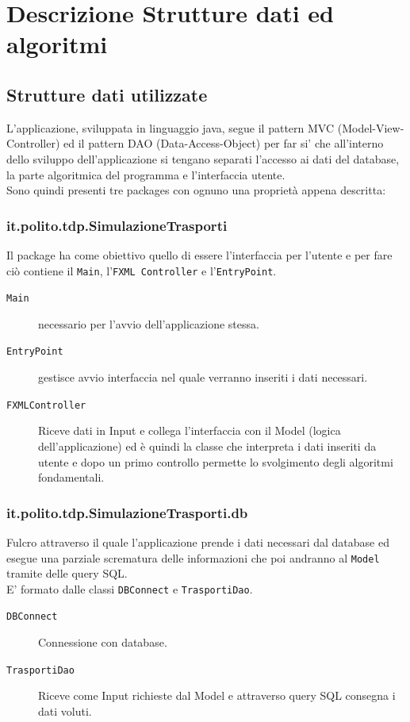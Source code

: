 \documentclass[a4paper,12pt]{report}
\begin{document}
\chapter{Descrizione Strutture dati ed algoritmi}
\label{Cap:DescrizioneStrutture}
\section{Strutture dati utilizzate}
L'applicazione, sviluppata in linguaggio java, segue il pattern MVC (Model-View-Controller) ed il pattern
DAO (Data-Access-Object) per far si' che all'interno dello sviluppo dell'applicazione si tengano
separati l'accesso ai dati del database, la parte algoritmica del programma e l'interfaccia utente.\\
Sono quindi presenti tre packages con ognuno una proprietà appena descritta:

\subsection{it.polito.tdp.SimulazioneTrasporti}
Il package ha come obiettivo quello di essere l'interfaccia per l'utente e per fare ciò contiene
il \texttt{Main}, l'\texttt{FXML Controller} e l'\texttt{EntryPoint}.
\begin{description}
	\item[\texttt{Main}] necessario per l'avvio dell'applicazione stessa.
	\item[\texttt{EntryPoint}] gestisce avvio interfaccia nel quale verranno inseriti i dati necessari.
	\item[\texttt{FXMLController}] Riceve dati in Input e collega l'interfaccia con il Model (logica dell'applicazione)
	ed è quindi la classe che interpreta i dati inseriti da utente e dopo un primo controllo permette 
	lo svolgimento degli algoritmi fondamentali.
\end{description}

\subsection{it.polito.tdp.SimulazioneTrasporti.db}
Fulcro attraverso il quale l'applicazione prende i dati necessari dal database ed esegue una parziale 
scrematura delle informazioni che poi andranno al \texttt{Model} tramite delle query SQL.\\
E' formato dalle classi \texttt{DBConnect} e \texttt{TrasportiDao}.
\begin{description}
	\item[\texttt{DBConnect}] Connessione con database.
	\item[\texttt{TrasportiDao}] Riceve come Input richieste dal Model e attraverso query SQL consegna i dati voluti.
\end{description}
\end{document}

